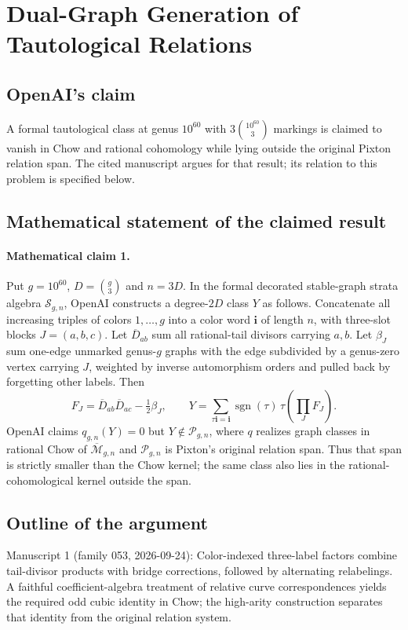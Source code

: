 \documentclass[11pt]{article}
\begin{document}
\section*{Dual-Graph Generation of Tautological Relations}

\subsection{OpenAI's claim}
A formal tautological class at genus $10^{60}$ with $3\binom{10^{60}}3$ markings is claimed to vanish in Chow and rational cohomology while lying outside the original Pixton relation span. The cited manuscript argues for that result; its relation to this problem is specified below.

\subsection{Mathematical statement of the claimed result}
\paragraph{Mathematical claim 1.} Put $g=10^{60}$, $D=\binom g3$ and $n=3D$. In the formal decorated stable-graph strata algebra $\mathcal S_{g,n}$, OpenAI constructs a degree-$2D$ class $Y$ as follows. Concatenate all increasing triples of colors $1,\ldots,g$ into a color word $\mathbf i$ of length $n$, with three-slot blocks $J=(a,b,c)$. Let $\overline D_{ab}$ sum all rational-tail divisors carrying $a,b$. Let $\beta_J$ sum one-edge unmarked genus-$g$ graphs with the edge subdivided by a genus-zero vertex carrying $J$, weighted by inverse automorphism orders and pulled back by forgetting other labels. Then
\[
F_J=\overline D_{ab}\overline D_{ac}-\tfrac12\beta_J,\qquad
Y=\sum_{\tau\mathbf i=\mathbf i}\operatorname{sgn}(\tau)\,\tau\left(\prod_JF_J\right).
\]
OpenAI claims $q_{g,n}(Y)=0$ but $Y\notin\mathcal P_{g,n}$, where $q$ realizes graph classes in rational Chow of $\overline{\mathcal M}_{g,n}$ and $\mathcal P_{g,n}$ is Pixton's original relation span. Thus that span is strictly smaller than the Chow kernel; the same class also lies in the rational-cohomological kernel outside the span.

\subsection{Outline of the argument}
Manuscript 1 (family 053, 2026-09-24): Color-indexed three-label factors combine tail-divisor products with bridge corrections, followed by alternating relabelings. A faithful coefficient-algebra treatment of relative curve correspondences yields the required odd cubic identity in Chow; the high-arity construction separates that identity from the original relation system.
\end{document}
